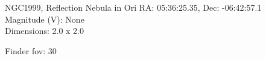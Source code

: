 \begin{block}{NGC1999, Reflection Nebula in Ori}
    RA: 05:36:25.35, Dec: -06:42:57.1 \\ 
    Magnitude (V): None \\ 
    Dimensions: 2.0 x 2.0 

    Finder fov: 30 
\end{block}